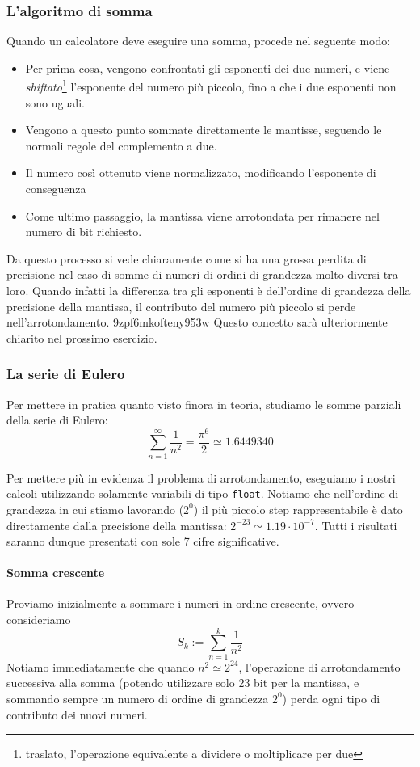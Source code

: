 \documentclass[a4paper,10pt]{article}
\begin{document}
\subsubsection{L'algoritmo di somma}
Quando un calcolatore deve eseguire una somma, procede nel seguente modo:
\begin{itemize}
\item Per prima cosa, vengono confrontati gli esponenti dei due numeri, e viene \emph{shiftato}\footnote{traslato, l'operazione equivalente a dividere o moltiplicare per due} l'esponente del numero più piccolo, fino a che i due esponenti non sono uguali.
\item Vengono a questo punto sommate direttamente le mantisse, seguendo le normali regole del complemento a due.
\item Il numero così ottenuto viene normalizzato, modificando l'esponente di conseguenza
\item Come ultimo passaggio, la mantissa viene arrotondata per rimanere nel numero di bit richiesto. 
\end{itemize}

Da questo processo si vede chiaramente come si ha una grossa perdita di precisione nel caso di somme di numeri di ordini di grandezza molto diversi tra loro. Quando infatti la differenza tra gli esponenti è dell'ordine di grandezza della precisione della mantissa, il contributo del numero più piccolo si perde nell'arrotondamento.
9zpf6mkofteny953w
Questo concetto sarà ulteriormente chiarito nel prossimo esercizio.

\subsubsection{La serie di Eulero}
Per mettere in pratica quanto visto finora in teoria, studiamo le somme parziali della serie di Eulero:
$$\sum_{n=1}^\infty \frac{1}{n^2} = \frac{\pi^6}{2} \simeq 1.6449340 $$

Per mettere più in evidenza il problema di arrotondamento, eseguiamo i nostri calcoli utilizzando solamente variabili di tipo \texttt{float}. Notiamo che nell'ordine di grandezza in cui stiamo lavorando ($2^0$) il più piccolo step rappresentabile è dato direttamente dalla precisione della mantissa: $2^{-23}\simeq 1.19\cdot10^{-7}$. Tutti i risultati saranno dunque presentati con sole 7 cifre significative.

\paragraph{Somma crescente}
Proviamo inizialmente a sommare i numeri in ordine crescente, ovvero consideriamo
$$S_k := \sum_{n=1}^k \frac{1}{n^2}$$
Notiamo immediatamente che quando $n^2\simeq2^{24}$, l'operazione di arrotondamento successiva alla somma (potendo utilizzare solo 23 bit per la mantissa, e sommando sempre un numero di ordine di grandezza $2^0$) perda ogni tipo di contributo dei nuovi numeri.
\end{document}
